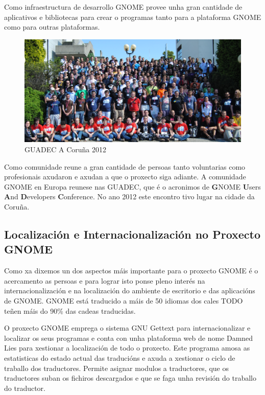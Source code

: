 Como infraestructura de desarrollo GNOME provee unha gran cantidade de aplicativos e bibliotecas para crear o programas tanto para a plataforma GNOME como para outras plataformas.

\begin{figure}[h!]
    \centering
    \includegraphics[width=\textwidth]{img/guadec_2012.png}
    \caption{GUADEC A Coruña 2012}
    \label{fig:guadec2012}
\end{figure}

Como comunidade reune a gran cantidade de persoas tanto voluntarias como profesionais axudaron e axudan a que o proxecto siga adiante. A comunidade GNOME en Europa reunese nas GUADEC, que é o acronimos de \textbf{G}NOME \textbf{U}sers \textbf{A}nd \textbf{D}evelopers \textbf{C}onference. No ano 2012 este encontro tivo lugar na cidade da Coruña.

\subsection{Localización e Internacionalización no Proxecto GNOME}
Como xa dixemos un dos aspectos máis importante para o proxecto GNOME é o acercamento as persoas e para lograr isto ponse pleno interés na internacionalización e na localización do ambiente de escritorio e das aplicacións de GNOME. GNOME está traducido a máis de 50 idiomas dos cales TODO teñen máis do 90\% das cadeas traducidas.

O proxecto GNOME emprega o sistema GNU Gettext para internacionalizar e localizar os seus programas e conta con unha plataforma web de nome Damned Lies para xestionar a localización de todo o proxecto. Este programa amosa as estatisticas do estado actual das traducións e axuda a xestionar o ciclo de traballo dos traductores. Permite asignar modulos a traductores, que os traductores suban os fichiros descargados e que se faga unha revisión do traballo do traductor.

